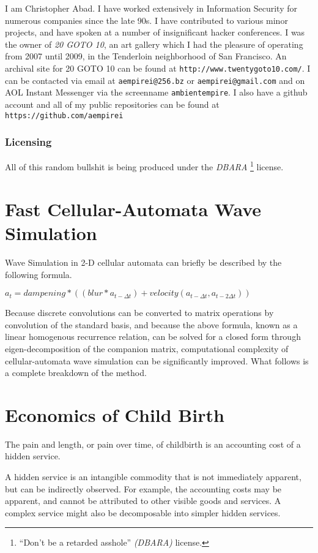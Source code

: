 \documentclass[11pt]{book}
\begin{document}
I am Christopher Abad. I have worked extensively in Information Security for numerous companies since the late 90s. I have contributed to various minor projects, and have spoken at a number of insignificant hacker conferences. I was the owner of \emph{20 GOTO 10}, an art gallery which I had the pleasure of operating from 2007 until 2009, in the Tenderloin neighborhood of San Francisco. An archival site for 20 GOTO 10 can be found at {\tt http://www.twentygoto10.com/}. I can be contacted via email at {\tt aempirei@256.bz} or {\tt aempirei@gmail.com} and on AOL Instant Messenger via the screenname {\tt ambientempire}. I also have a github account and all of my public repositories can be found at {\tt https://github.com/aempirei}

\subsection{Licensing}
\label{sec:DBARA}

All of this random bullshit is being produced under the \emph{DBARA}%
\footnote{``Don't be a retarded asshole'' \emph{(DBARA)} license.}
license.

\chapter{Fast Cellular-Automata Wave Simulation}

Wave Simulation in 2-D cellular automata can briefly be described by the following formula.

$\displaystyle a_{t} = dampening * ((blur * a_{t-{\Delta}t}) + velocity(a_{t-{\Delta}t},a_{t-2{\Delta}t})) $

Because discrete convolutions can be converted to matrix operations by convolution of the standard basis, and because the above formula, known as a linear homogenous recurrence relation, can be solved for a closed form through eigen-decomposition of the companion matrix, computational complexity of cellular-automata wave simulation can be significantly improved. What follows is a complete breakdown of the method.

\chapter{Economics of Child Birth}

The pain and length, or pain over time, of childbirth is an accounting cost of a hidden service.

A hidden service is an intangible commodity that is not immediately apparent, but can be indirectly observed. For example, the accounting costs may be apparent, and cannot be attributed to other visible goods and services. A complex service might also be decomposable into simpler hidden services.
\end{document}
